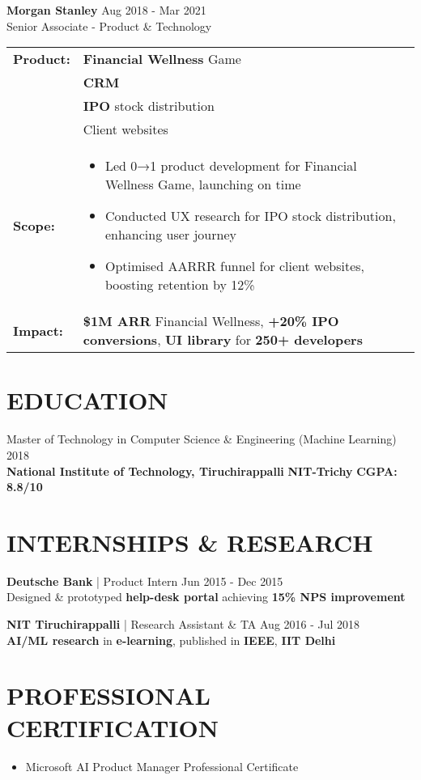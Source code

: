 \documentclass[10pt,a4paper]{article}
\newcommand{\experienceitem}[4]{
    \textbf{#1} \hfill #2 \\
    #3 \hfill \textit{#4}
}
\newcommand{\educationitem}[4]{
    #1 \hfill #2 \\
    #3 \hfill #4
}
\begin{document}
\experienceitem{\textbf{Morgan Stanley}}{Aug 2018 - Mar 2021}{Senior Associate - Product \& Technology}{}

{\renewcommand{\arraystretch}{1.2}
\begin{tabularx}{\textwidth}{|>{\raggedright\arraybackslash}p{1.8cm}|X|}
\hline
\textbf{Product:} & \textbf{Financial Wellness} Game \\ & \textbf{CRM} \\ & \textbf{IPO} stock distribution \\ & Client websites \\ \hline
\textbf{Scope:} & \begin{itemize}[leftmargin=*,nosep]
    \item Led 0→1 product development for Financial Wellness Game, launching on time
    \item Conducted UX research for IPO stock distribution, enhancing user journey
    \item Optimised AARRR funnel for client websites, boosting retention by 12\%
\end{itemize} \\ \hline
\textbf{Impact:} & \textbf{\$1M ARR} Financial Wellness, \textbf{+20\% IPO conversions}, \textbf{UI library} for \textbf{250+ developers} \\ \hline
\end{tabularx}}

\section{EDUCATION}

\educationitem{Master of Technology in Computer Science \& Engineering (Machine Learning)}{ 2018}{\textbf{National Institute of Technology, Tiruchirappalli} \textbf{NIT-Trichy}}{\textbf{CGPA: 8.8/10}}

\section{INTERNSHIPS \& RESEARCH}

\textbf{Deutsche Bank} | Product Intern \hfill Jun 2015 - Dec 2015 \\
Designed \& prototyped \textbf{help-desk portal} achieving \textbf{15\% NPS improvement}

\textbf{NIT Tiruchirappalli} | Research Assistant \& TA \hfill Aug 2016 - Jul 2018 \\
\textbf{AI/ML research} in \textbf{e-learning}, published in \textbf{IEEE}, \textbf{IIT Delhi}

\section{PROFESSIONAL CERTIFICATION}

\begin{itemize}[leftmargin=*]
    \item Microsoft AI Product Manager Professional Certificate 
\end{itemize}
\end{document}
